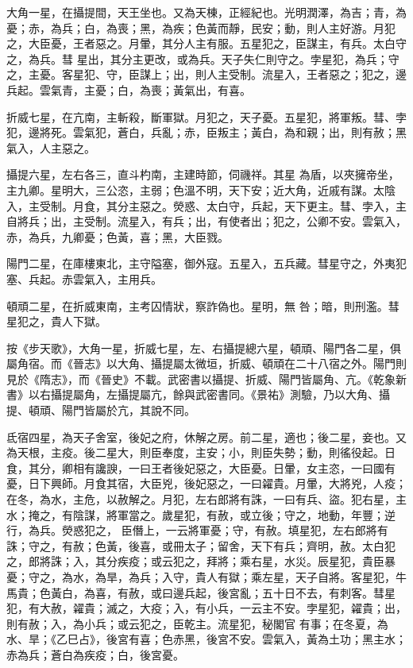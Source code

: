 \begin{pinyinscope}
 大角一星，在攝提間，天王坐也。又為天棟，正經紀也。光明潤澤，為吉；青，為憂；赤，為兵；白，為喪；黑，為疾；色黃而靜，民安；動，則人主好游。月犯之，大臣憂，王者惡之。月暈，其分人主有服。五星犯之，臣謀主，有兵。太白守之，為兵。彗
 星出，其分主更改，或為兵。天子失仁則守之。孛星犯，為兵；守之，主憂。客星犯、守，臣謀上；出，則人主受制。流星入，王者惡之；犯之，邊兵起。雲氣青，主憂；白，為喪；黃氣出，有喜。



 折威七星，在亢南，主斬殺，斷軍獄。月犯之，天子憂。五星犯，將軍叛。彗、孛犯，邊將死。雲氣犯，蒼白，兵亂；赤，臣叛主；黃白，為和親；出，則有赦；黑氣入，人主惡之。



 攝提六星，左右各三，直斗杓南，主建時節，伺禨祥。其星
 為盾，以夾擁帝坐，主九卿。星明大，三公恣，主弱；色溫不明，天下安；近大角，近戚有謀。太陰入，主受制。月食，其分主惡之。熒惑、太白守，兵起，天下更主。彗、孛入，主自將兵；出，主受制。流星入，有兵；出，有使者出；犯之，公卿不安。雲氣入，赤，為兵，九卿憂；色黃，喜；黑，大臣戮。



 陽門二星，在庫樓東北，主守隘塞，御外寇。五星入，五兵藏。彗星守之，外夷犯塞、兵起。赤雲氣入，主用兵。



 頓頑二星，在折威東南，主考囚情狀，察詐偽也。星明，無
 咎；暗，則刑濫。彗星犯之，貴人下獄。



 按《步天歌》，大角一星，折威七星，左、右攝提總六星，頓頑、陽門各二星，俱屬角宿。而《晉志》以大角、攝提屬太微垣，折威、頓頑在二十八宿之外。陽門則見於《隋志》，而《晉史》不載。武密書以攝提、折威、陽門皆屬角、亢。《乾象新書》以右攝提屬角，左攝提屬亢，餘與武密書同。《景祐》測驗，乃以大角、攝提、頓頑、陽門皆屬於亢，其說不同。



 氐宿四星，為天子舍室，後妃之府，休解之房。前二星，適也；後二星，妾也。又為天根，主疫。後二星大，則臣奉度，主安；小，則臣失勢；動，則徭役起。日食，其分，卿相有讒諛，一曰王者後妃惡之，大臣憂。日暈，女主恣，一曰國有憂，日下興師。月食其宿，大臣兇，後妃惡之，一曰糴貴。月暈，大將兇，人疫；在冬，為水，主危，以赦解之。月犯，左右郎將有誅，一曰有兵、盜。犯右星，主水；掩之，有陰謀，將軍當之。歲星犯，有赦，或立後；守之，地動，年豐；逆行，為兵。熒惑犯之，
 臣僭上，一云將軍憂；守，有赦。填星犯，左右郎將有誅；守之，有赦；色黃，後喜，或冊太子；留舍，天下有兵；齊明，赦。太白犯之，郎將誅；入，其分疾疫；或云犯之，拜將；乘右星，水災。辰星犯，貴臣暴憂；守之，為水，為旱，為兵；入守，貴人有獄；乘左星，天子自將。客星犯，牛馬貴；色黃白，為喜，有赦，或曰邊兵起，後宮亂；五十日不去，有刺客。彗星犯，有大赦，糴貴；滅之，大疫；入，有小兵，一云主不安。孛星犯，糴貴；出，則有赦；入，為小兵；或云犯之，臣乾主。流星犯，秘閣官
 有事；在冬夏，為水、旱；《乙巳占》，後宮有喜；色赤黑，後宮不安。雲氣入，黃為土功；黑主水；赤為兵；蒼白為疾疫；白，後宮憂。




\end{pinyinscope}
